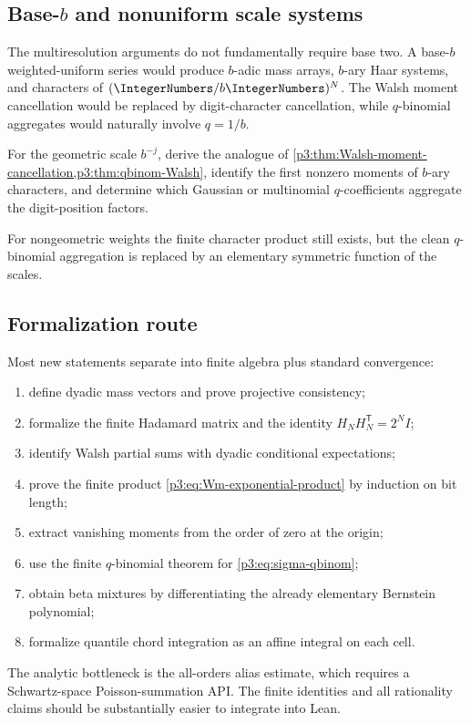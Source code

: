 \documentclass[11pt]{article}
\theoremstyle{definition}
\theoremstyle{remark}
\begin{document}
\subsection[Base-b and nonuniform scale systems]{Base-$b$ and nonuniform scale systems}

The multiresolution arguments do not fundamentally require base two.  A
base-$b$ weighted-uniform series would produce $b$-adic mass arrays,
$b$-ary Haar systems, and characters of $(\IntegerNumbers/b\IntegerNumbers)^N$.  The Walsh moment
cancellation would be replaced by digit-character cancellation, while
$q$-binomial aggregates would naturally involve $q=1/b$.

\begin{openproblem}
\label{p3:op:base-b}
For the geometric scale $b^{-j}$, derive the analogue of
\cref{p3:thm:Walsh-moment-cancellation,p3:thm:qbinom-Walsh}, identify the first
nonzero moments of $b$-ary characters, and determine which Gaussian or
multinomial $q$-coefficients aggregate the digit-position factors.
\end{openproblem}

For nongeometric weights the finite character product still exists, but the
clean $q$-binomial aggregation is replaced by an elementary symmetric function
of the scales.

\subsection{Formalization route}

Most new statements separate into finite algebra plus standard convergence:
\begin{enumerate}
\item define dyadic mass vectors and prove projective consistency;
\item formalize the finite Hadamard matrix and the identity
      $H_NH_N^{\mathsf T}=2^NI$;
\item identify Walsh partial sums with dyadic conditional expectations;
\item prove the finite product \eqref{p3:eq:Wm-exponential-product} by induction on
      bit length;
\item extract vanishing moments from the order of zero at the origin;
\item use the finite $q$-binomial theorem for
      \eqref{p3:eq:sigma-qbinom};
\item obtain beta mixtures by differentiating the already elementary
      Bernstein polynomial;
\item formalize quantile chord integration as an affine integral on each cell.
\end{enumerate}
The analytic bottleneck is the all-orders alias estimate, which requires a
Schwartz-space Poisson-summation API.  The finite identities and all rationality
claims should be substantially easier to integrate into Lean.
\end{document}
